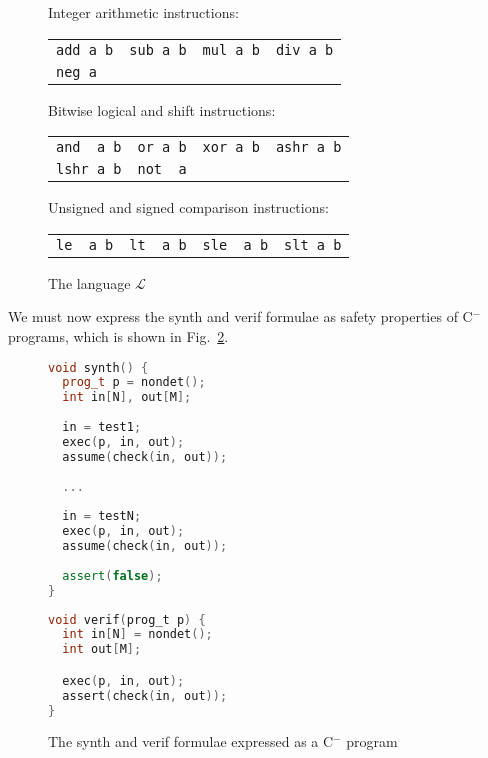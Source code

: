 \documentclass[a4paper]{llncs}
\newcommand{\newC}{C$^-$\xspace}
\begin{document}
\begin{figure}
\begin{center}
\setlength{\tabcolsep}{16pt}
Integer arithmetic instructions:

\begin{tabular}{llll}
 \verb|add a b| & \verb|sub a b| & \verb|mul a b| & \verb|div a b| \\
 \verb|neg a| & & &
\end{tabular}

\medskip

Bitwise logical and shift instructions:

\begin{tabular}{llll}
 \verb|and  a b| & \verb|or a b| & \verb|xor a b| & \verb|ashr a b| \\
 \verb|lshr a b| & \verb|not  a| & &
\end{tabular}

\medskip

Unsigned and signed comparison instructions:

\begin{tabular}{llll}
 \verb|le  a b| & \verb|lt  a b| & \verb|sle  a b| & \verb|slt a b|
\end{tabular}
\end{center}

 \caption{The language $\mathcal{L}$}
 \label{fig:l-language}

\end{figure}

We must now express the {\sc synth} and {\sc verif} formulae as safety properties
of \newC programs, which is shown in Fig.~\ref{fig:c-synthverif}.

\begin{figure}
\centering
\begin{minipage}{0.45\textwidth}
\begin{lstlisting}[language=C++]
void synth() {
  prog_t p = nondet();
  int in[N], out[M];
  
  in = test1;
  exec(p, in, out);
  assume(check(in, out));
  
  ...
  
  in = testN;
  exec(p, in, out);
  assume(check(in, out));
  
  assert(false);
}
\end{lstlisting}
\end{minipage}
\begin{minipage}{0.45\textwidth}
\begin{lstlisting}[language=C]
void verif(prog_t p) {
  int in[N] = nondet();
  int out[M];

  exec(p, in, out);
  assert(check(in, out));
}
\end{lstlisting}
\end{minipage}

 \caption{The {\sc synth} and {\sc verif} formulae expressed as a \newC program}
 \label{fig:c-synthverif}
\end{figure}
\end{document}
